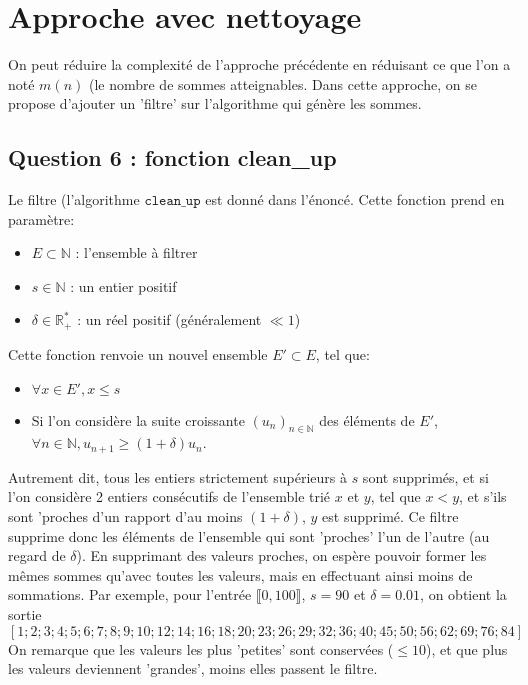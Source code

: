 \documentclass[10pt]{article}
\begin{document}
	\newpage
	\section{Approche avec nettoyage}\label{approche_naive}
		On peut réduire la complexité de l'approche précédente en réduisant ce que l'on a noté $m(n)$ (le nombre de sommes atteignables.
		Dans cette approche, on se propose d'ajouter un 'filtre' sur l'algorithme qui génère les sommes.
			\subsection{Question 6 : fonction clean\_up}
				Le filtre (l'algorithme $\mathtt{clean\_up}$ est donné dans l'énoncé. Cette fonction prend en paramètre:
				\begin{itemize}[label=-]
					\setlength\itemsep{0.1em}
					\item $E \subset \mathbb{N}$ : l'ensemble à filtrer
					\item $s \in \mathbb{N}$ : un entier positif
					\item $\delta \in \mathbb{R}_+^*$ : un réel positif (généralement $\ll 1$)
				\end{itemize}
				Cette fonction renvoie un nouvel ensemble $E' \subset E$, tel que:
				\begin{itemize}[label=-]
					\setlength\itemsep{0.1em}
					\item	$\forall x \in E' , x \leq s$
					\item	Si l'on considère la suite croissante $(u_n)_{n \in \mathbb{N}}$ des éléments de $E'$,
							$\forall n \in \mathbb{N}, u_{n + 1} \geq (1 + \delta)u_n $.
				\end{itemize}
	
				Autrement dit, tous les entiers strictement supérieurs à $s$ sont supprimés, et 
				si l'on considère 2 entiers consécutifs de l'ensemble trié $x$ et $y$, tel que $x < y$,
				et s'ils sont 'proches d'un rapport d'au moins $(1 + \delta)$, $y$ est supprimé.
				Ce filtre supprime donc les éléments de l'ensemble qui sont 'proches' l'un de l'autre (au regard de $\delta$).
				En supprimant des valeurs proches, on espère pouvoir former les mêmes sommes qu'avec toutes les valeurs,
				mais en effectuant ainsi moins de sommations.
				\newline
				\newline
				Par exemple, pour l'entrée $\llbracket 0, 100 \rrbracket$, $s = 90$ et $\delta=0.01$, on obtient la sortie
				$$[1; 2; 3; 4; 5; 6; 7; 8; 9; 10; 12; 14; 16; 18; 20; 23; 26; 29; 32; 36; 40; 45; 50; 56; 62; 69; 76; 84]$$
				On remarque que les valeurs les plus 'petites' sont conservées ($\leq 10$), et que plus les valeurs deviennent 'grandes',
				moins elles passent le filtre.
				
\end{document}
